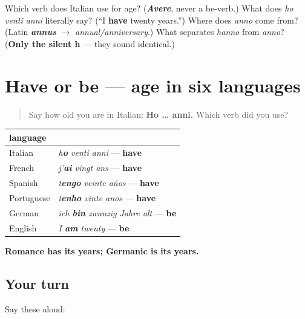 \begin{tcolorbox}[breakable,colback=teal!4,colframe=teal!35!black,title={Before you move on}]
Which verb does Italian use for age? (\emph{\textbf{Avere}}, never a be-verb.) What does \emph{ho venti anni} literally say? (\textquotedblleft{}I \textbf{have} twenty years.\textquotedblright{}) Where does \emph{anno} come from? (Latin \emph{\textbf{annus}} $\to$ \emph{annual/anniversary}.) What separates \emph{hanno} from \emph{anno}? (\textbf{Only the silent h} — they sound identical.)
\end{tcolorbox}
\section[(have or be)]{Have or be — age in six languages}

\label{lesson:IT-C14-avere-o-essere}



\begin{quote}
Say how old you are in Italian: \textbf{Ho … anni.} Which verb did you use?
\end{quote}

\begin{grammarlens}[title={Grammar Lens: who has and who is}]
\noindent
\begin{tabularx}{\linewidth}{@{}>{\raggedright\arraybackslash}X>{\raggedright\arraybackslash}X@{}}
\toprule
\textbf{language} & \textbf{} \\
\midrule
Italian & \emph{h\textbf{o} venti anni} — \textbf{have} \\
French & \emph{j'\textbf{ai} vingt ans} — \textbf{have} \\
Spanish & \emph{t\textbf{engo} veinte años} — \textbf{have} \\
Portuguese & \emph{t\textbf{enho} vinte anos} — \textbf{have} \\
German & \emph{ich \textbf{bin} zwanzig Jahre alt} — \textbf{be} \\
English & \emph{I \textbf{am} twenty} — \textbf{be} \\
\bottomrule
\end{tabularx}

\textbf{Romance has its years; Germanic is its years.}
\end{grammarlens}

\subsection*{Your turn}
Say these aloud:

